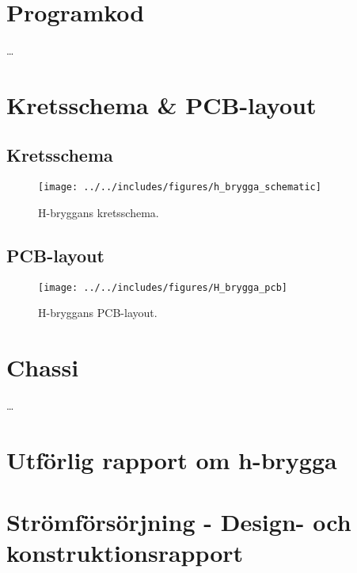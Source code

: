 \appendix

\section{Programkod}
\ldots

\section{Kretsschema \& PCB-layout}
\subsection{Kretsschema}
\begin{landscape}
\begin{figure}[htbp!]
\centering
\texttt{[image: ../../includes/figures/h\_brygga\_schematic]}
\caption{H-bryggans kretsschema.}
\label{fig:appendix_h_brygga_schema}
\end{figure}
\end{landscape}

\subsection{PCB-layout}
\begin{figure}[htbp!]
\centering
\texttt{[image: ../../includes/figures/H\_brygga\_pcb]}
\caption{H-bryggans PCB-layout.}
\label{fig:appendix_pcb_layout}
\end{figure}

\section{Chassi}
\ldots
\section{Utförlig rapport om h-brygga}
\label{apx:H-bridge}


\section{Strömförsörjning - Design- och konstruktionsrapport}
\label{apx:PSU}

